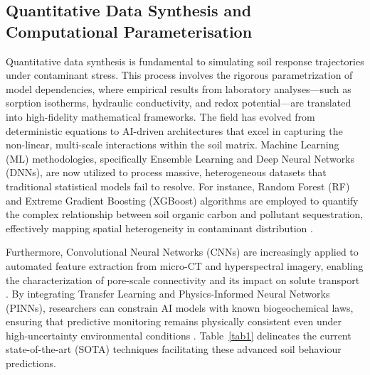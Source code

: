 \documentclass[sn-mathphys-num]{sn-jnl}
\begin{document}
\subsection{Quantitative Data Synthesis and Computational
    Parameterisation}\label{sec2.2}

Quantitative data synthesis is fundamental to simulating soil response
trajectories under contaminant stress. This process involves the rigorous
parametrization of model dependencies, where empirical results from laboratory
analyses---such as sorption isotherms, hydraulic conductivity, and redox
potential---are translated into high-fidelity mathematical frameworks. The
field has evolved from deterministic equations to AI-driven architectures that
excel in capturing the non-linear, multi-scale interactions within the soil
matrix. Machine Learning (ML) methodologies, specifically Ensemble Learning
and Deep Neural Networks (DNNs), are now utilized to process massive,
heterogeneous datasets that traditional statistical models fail to resolve.
For instance, Random Forest (RF) and Extreme Gradient Boosting (XGBoost)
algorithms are employed to quantify the complex relationship between soil
organic carbon and pollutant sequestration, effectively mapping spatial
heterogeneity in contaminant distribution \cite{Wadoux2024,Sahab2025}.

Furthermore, Convolutional Neural Networks (CNNs) are increasingly applied to
automated feature extraction from micro-CT and hyperspectral imagery, enabling
the characterization of pore-scale connectivity and its impact on solute
transport \cite{Demiraletal2026}. By integrating Transfer Learning and
Physics-Informed Neural Networks (PINNs), researchers can constrain AI models
with known biogeochemical laws, ensuring that predictive monitoring remains
physically consistent even under high-uncertainty environmental conditions
\cite{Karpatne2024,Nguyen2025}. Table~\ref{tab1} delineates the current
state-of-the-art (SOTA) techniques facilitating these advanced soil behaviour
predictions.
\end{document}
